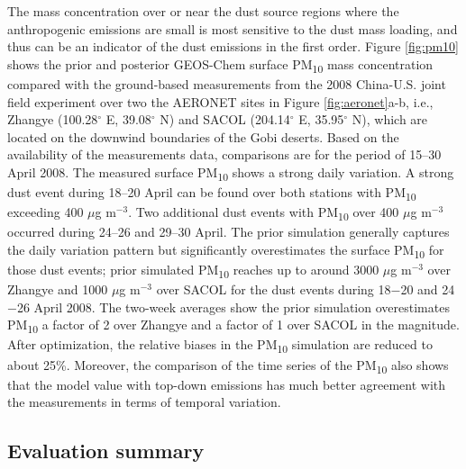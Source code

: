 The mass concentration over or near the dust source regions
 where the anthropogenic emissions are small is most sensitive to the dust mass loading,
 and thus can be an indicator of the dust emissions in the first order.
 Figure \ref{fig:pm10} shows the prior and posterior GEOS-Chem surface
 PM\textsubscript{10} mass concentration compared with the ground-based measurements
 from the 2008 China-U.S. joint field experiment \citep{Ge10,Huang10} over two the AERONET sites
 in Figure \ref{fig:aeronet}a-b, i.e., Zhangye (100.28$^{\circ}$ E, 39.08$^{\circ}$ N)
 and SACOL (204.14$^{\circ}$ E, 35.95$^{\circ}$ N), which are located
 on the downwind boundaries of the Gobi deserts.
 Based on the availability of the measurements data, comparisons are for the period of 15--30 April 2008.
 The measured surface PM\textsubscript{10} shows a strong daily variation.
 A strong dust event during 18--20 April can be found over both stations with
 PM\textsubscript{10} exceeding 400 $\mu$g m$^{-3}$.
 Two additional dust events with PM\textsubscript{10} over 400 $\mu$g m$^{-3}$ occurred during
 24--26 and 29--30 April.
 The prior simulation generally captures the daily variation pattern
 but significantly overestimates the surface PM\textsubscript{10} for those dust events;
 prior simulated PM\textsubscript{10} reaches up to around 3000 $\mu$g m$^{-3}$ over Zhangye
 and 1000 $\mu$g m$^{-3}$ over SACOL for the dust events during 18$-$20 and 24$-$26 April 2008.
 The two-week averages show the prior simulation overestimates PM\textsubscript{10}
 a factor of 2 over Zhangye and a factor of 1 over SACOL in the magnitude.
 After optimization, the relative biases in the PM\textsubscript{10} simulation are reduced to about 25\%.
 Moreover, the comparison of the time series of the PM\textsubscript{10} also shows that
 the model value with top-down emissions has much better agreement
 with the measurements in terms of temporal variation.

 \subsection{Evaluation summary}

